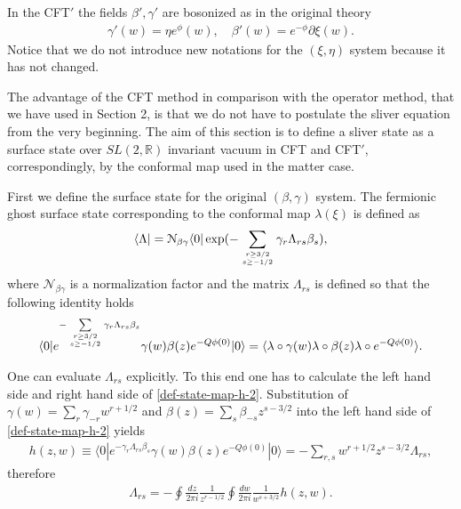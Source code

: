 \documentclass[a4paper,12pt]{article}
\newcommand{\pd}{\partial}
\begin{document}
In the CFT$'$ the fields $\beta',\gamma'$ are bosonized as in the original
theory
\begin{gather}
\gamma'(w)=\eta e^{\phi}(w),\quad
\beta'(w)= e^{-\phi}\pd\xi(w).
\end{gather}
Notice that we do not introduce new notations for the
$(\xi,\eta)$ system because it has  not changed.


The advantage of the CFT method in comparison with the operator method,
that we have used in  Section 2, is that we do not have
to postulate the sliver equation from the very beginning.
The aim of this section is to define a sliver state as a surface state
over $SL(2,\mathbb{R})$ invariant vacuum in CFT and  CFT$'$, correspondingly,
by the conformal map used in the matter case.

First we define the surface state for the original $(\beta,\gamma)$ system.
The fermionic ghost surface state
corresponding to the conformal map $\lambda(\xi)$ is defined as
\begin{gather}
\langle\Lambda|=\mathcal{N}_{\beta\gamma} \langle 0|\exp(-\sum_{r\geq 3/2\atop s\geq -1/2}\gamma_{r}\Lambda_{rs}\beta_{s}),
\end{gather}
where $\mathcal{N}_{\beta\gamma}$ is a normalization factor and
the matrix $\Lambda_{rs}$ is defined so that
the following identity holds
\begin{gather}
\langle 0|e^{-\sum\limits_{r\geq 3/2 \atop s\geq
-1/2}\gamma_{r}\Lambda_{rs}\beta_{s}}\gamma(w)
\beta(z)e^{-Q\phi(0)}|0\rangle=
\langle \lambda\circ \gamma(w)\lambda\circ
\beta(z)\lambda\circ e^{-Q\phi(0)}\rangle.
\label{def-state-map-h-2}
\end{gather}

One can evaluate $\Lambda_{rs}$
explicitly. To this end one has to calculate the left hand side and
right hand side of \eqref{def-state-map-h-2}.
Substitution of
$\gamma(w)=\sum_{r}\gamma_{-r}w^{r+1/2}$ and
$\beta(z)=\sum_{s}\beta_{-s}z^{s-3/2}$ into the left hand side of \eqref{def-state-map-h-2}
yields
\begin{gather}
h(z,w)\equiv\langle 0|e^{-\gamma_{r}\Lambda_{rs}\beta_{s}}\gamma(w)\beta(z)e^{-Q\phi(0)}|0\rangle= -\sum_{r,s}w^{r+1/2}z^{s-3/2}\Lambda_{rs},\end{gather}
therefore
\begin{gather}
\Lambda_{rs}=-\oint\frac{dz}{2\pi i}\frac{1}{z^{r-1/2}}
\oint\frac{dw}{2\pi i}\frac{1}{w^{s+3/2}}h(z,w).
\end{gather}
\end{document}
